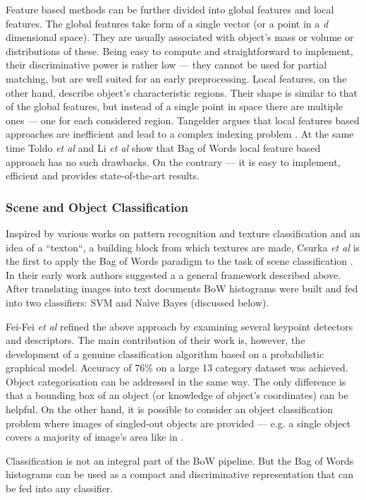 		Feature based methods can be further divided into global features and local features. The global features take form of a single vector (or a point in a \emph{d} dimensional space). They are usually associated with object's mass or volume or distributions of these. Being easy to compute and straightforward to implement, their discriminative power is rather low --- they cannot be used for partial matching, but are well suited for an early preprocessing. Local features, on the other hand, describe object's characteristic regions. Their shape is similar to that of the global features, but instead of a single point in space there are multiple ones --- one for each considered region. Tangelder argues that local features based approaches are inefficient and lead to a complex indexing problem \cite{tangelder2008survey}. At the same time Toldo \emph{et al} and Li \emph{et al} show that Bag of Words local feature based approach has no such drawbacks. On the contrary --- it is easy to implement, efficient and provides state-of-the-art results.
		
		\subsubsection{Scene and Object Classification}
		Inspired by various works on pattern recognition and texture classification and an idea of a ``texton``, a building block from which textures are made, Csurka \emph{et al} is the first to apply the Bag of Words paradigm to the task of scene classification \cite{csurka2004visual}. In their early work authors suggested a a general framework described above. After translating images into text documents BoW histograms were built and fed into two classifiers: SVM and Na\`ive Bayes (discussed below). 		

		Fei-Fei \emph{et al} refined the above approach by examining several keypoint detectors and descriptors. The main contribution of their work is, however, the development of a genuine classification algorithm based on a probabilistic graphical model. Accuracy of 76\% on a large 13 category dataset was achieved.
		Object categorisation can be addressed in the same way. The only difference is that a bounding box of an object (or knowledge of object's coordinates) can be helpful. On the other hand, it is possible to consider an object classification problem where images of singled-out objects are provided --- e.g. a single object covers a majority of image's area like in \cite{zhangcategory}.

		Classification is not an integral part of the BoW pipeline. But the Bag of Words histograms can be used as a compact and discriminative representation that can be fed into any classifier.
		
